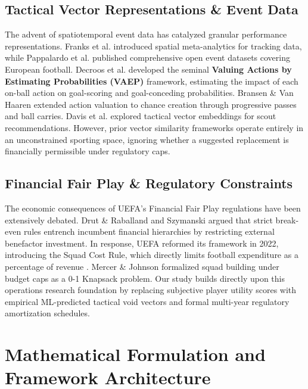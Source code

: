 \documentclass[10pt,journal,compsoc]{IEEEtran}
\begin{document}
\subsection{Tactical Vector Representations \& Event Data}
The advent of spatiotemporal event data has catalyzed granular performance representations. Franks et al. \cite{franks2016meta} introduced spatial meta-analytics for tracking data, while Pappalardo et al. \cite{pappalardo2019public} published comprehensive open event datasets covering European football. Decroos et al. \cite{decroos2019actions} developed the seminal \textbf{Valuing Actions by Estimating Probabilities (VAEP)} framework, estimating the impact of each on-ball action on goal-scoring and goal-conceding probabilities. Bransen \& Van Haaren \cite{bransen2020measuring} extended action valuation to chance creation through progressive passes and ball carries. Davis et al. \cite{davis2022tactical} explored tactical vector embeddings for scout recommendations. However, prior vector similarity frameworks operate entirely in an unconstrained sporting space, ignoring whether a suggested replacement is financially permissible under regulatory caps.

\subsection{Financial Fair Play \& Regulatory Constraints}
The economic consequences of UEFA's Financial Fair Play regulations have been extensively debated. Drut \& Raballand \cite{drut2014financial} and Szymanski \cite{szymanski2014fair} argued that strict break-even rules entrench incumbent financial hierarchies by restricting external benefactor investment. In response, UEFA reformed its framework in 2022, introducing the Squad Cost Rule, which directly limits football expenditure as a percentage of revenue \cite{uefa2022club}. Mercer \& Johnson \cite{mercer2021moneyball} formalized squad building under budget caps as a 0-1 Knapsack problem. Our study builds directly upon this operations research foundation by replacing subjective player utility scores with empirical ML-predicted tactical void vectors and formal multi-year regulatory amortization schedules.

\section{Mathematical Formulation and Framework Architecture}
\label{sec:formulation}
\end{document}
